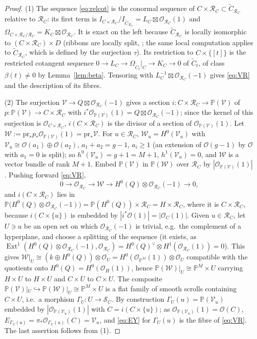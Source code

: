 \documentclass[11pt,reqno]{amsart}
\theoremstyle{plain}
\theoremstyle{definition}
\newcommand{\PP}{\mathbb{P}}
\newcommand{\PM}{\mathbb{P}^M}
\newcommand{\OO}{\mathcal{O}}
\newcommand{\Ext}{\operatorname{Ext}}
\newcommand{\Ct}{\widetilde{C}}
\newcommand{\SC}{\mathcal{S}_C}
\newcommand{\RC}{\mathcal{R}_C}
\newcommand{\Dd}{D}
\newcommand{\pr}{\mathrm{pr}}
\begin{document}
\begin{proof}
(1) The sequence \eqref{eq:relcot} is the conormal sequence of $C\times\RC\subset\Ct_{\RC}$ relative to $\RC$: its first term is $I_{C\times\RC}/I_{\Ct_{\RC}}=L_C\boxtimes\OO_{\RC}(1)$ and $\Omega_{C\times\RC/\RC}=K_C\boxtimes\OO_{\RC}$. It is exact on the left because $\Ct_{\RC}$ is locally isomorphic to $(C\times\RC)\times\Dd$ (ribbons are locally split, \cite[\S1]{BE95}; the same local computation applies to $\Ct_{\RC}$, which is defined by the surjection $\tau$). Its restriction to $C\times\{[t]\}$ is the restricted cotangent sequence $0\to L_C\to\Omega_{\Ct_t}|_C\to K_C\to0$ of $\Ct_t$, of class $\beta(t)\ne0$ by Lemma~\ref{lem:beta}. Tensoring with $L_C^{-1}\boxtimes\OO_{\RC}(-1)$ gives \eqref{eq:VR} and the description of its fibres.

(2) The surjection $\mathcal{V}\to Q\boxtimes\OO_{\RC}(-1)$ gives a section $i\colon C\times\RC\to\PP(\mathcal{V})$ of $p\colon\PP(\mathcal{V})\to C\times\RC$ with $i^*\OO_{\PP(\mathcal{V})}(1)=Q\boxtimes\OO_{\RC}(-1)$; since the kernel of this surjection is $\OO_{C\times\RC}$, $i(C\times\RC)$ is the divisor of a section of $\OO_{\PP(\mathcal{V})}(1)$. Let $\mathcal{W}:=\pr_*p_*\OO_{\PP(\mathcal{V})}(1)=\pr_*\mathcal{V}$. For $u\in\RC$, $\mathcal{W}_u=H^0(\mathcal{V}_u)$ with $\mathcal{V}_u\cong\OO(a_1)\oplus\OO(a_2)$, $a_1+a_2=g-1$, $a_i\ge1$ (an extension of $\OO(g-1)$ by $\OO$ with $a_1=0$ is split); so $h^0(\mathcal{V}_u)=g+1=M+1$, $h^1(\mathcal{V}_u)=0$, and $\mathcal{W}$ is a vector bundle of rank $M+1$. Embed $\PP(\mathcal{V})$ in $\PP(\mathcal{W})$ over $\RC$ by $|\OO_{\PP(\mathcal{V})}(1)|$. Pushing forward \eqref{eq:VR},
\[
0\to\OO_{\RC}\to\mathcal{W}\to H^0(Q)\otimes\OO_{\RC}(-1)\to0,
\]
and $i(C\times\RC)$ lies in $\PP\big(H^0(Q)\otimes\OO_{\RC}(-1)\big)=\PP(H^0(Q))\times\RC=H\times\RC$, where it is $C\times\RC$, because $i(C\times\{u\})$ is embedded by $|i^*\OO(1)|=|\OO_C(1)|$. Given $u\in\RC$, let $U\ni u$ be an open set on which $\OO_{\RC}(-1)$ is trivial, e.g.\ the complement of a hyperplane, and choose a splitting of the sequence (it exists, as $\Ext^1(H^0(Q)\otimes\OO_{\RC}(-1),\OO_{\RC})=H^0(Q)^{\vee}\otimes H^1(\OO_{\RC}(1))=0$). This gives $\mathcal{W}|_U\cong(k\oplus H^0(Q))\otimes\OO_U=H^0(\OO_{\PM}(1))\otimes\OO_U$ compatible with the quotients onto $H^0(Q)=H^0(\OO_H(1))$, hence $\PP(\mathcal{W})|_U\cong\PM\times U$ carrying $H\times U$ to $H\times U$ and $C\times U$ to $C\times U$. The composite $\PP(\mathcal{V})|_U\hookrightarrow\PP(\mathcal{W})|_U\cong\PM\times U$ is a flat family of smooth scrolls containing $C\times U$, i.e.\ a morphism $\Gamma_U\colon U\to\SC$. By construction $\Gamma_U(u)=\PP(\mathcal{V}_u)$ embedded by $|\OO_{\PP(\mathcal{V}_u)}(1)|$ with $C=i(C\times\{u\})$; as $\OO_{\PP(\mathcal{V}_u)}(1)=\OO(C)$, $E_{\Gamma_U(u)}=\pi_*\OO_{\Gamma_U(u)}(C)=\mathcal{V}_u$, and \eqref{eq:EY} for $\Gamma_U(u)$ is the fibre of \eqref{eq:VR}. The last assertion follows from (1).
\end{proof}
\end{document}
